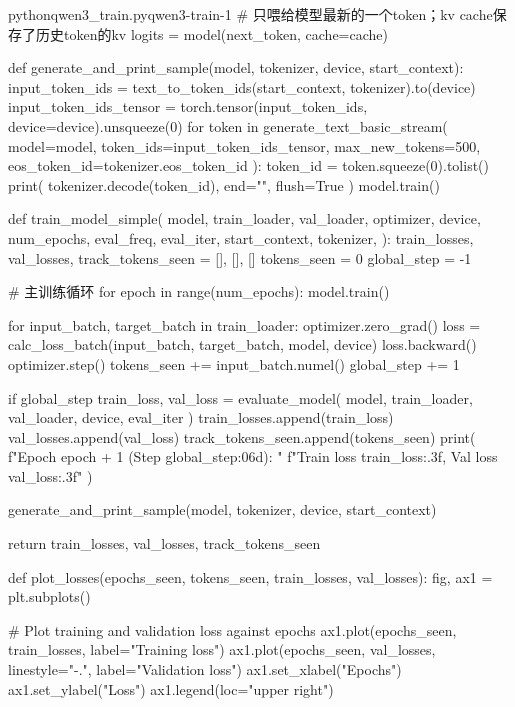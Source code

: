 \documentclass[lang=cn,newtx,10pt,scheme=chinese]{elegantbook}
\begin{document}
\begin{codebox}{python}{qwen3\_train.py}{qwen3-train-1}
            # 只喂给模型最新的一个token；kv cache保存了历史token的kv
            logits = model(next_token, cache=cache)

def generate_and_print_sample(model, tokenizer, device, start_context):
    input_token_ids = text_to_token_ids(start_context, tokenizer).to(device)
    input_token_ids_tensor = torch.tensor(input_token_ids, device=device).unsqueeze(0)
    for token in generate_text_basic_stream(
        model=model,
        token_ids=input_token_ids_tensor,
        max_new_tokens=500,
        eos_token_id=tokenizer.eos_token_id
    ):
        token_id = token.squeeze(0).tolist()
        print(
            tokenizer.decode(token_id),
            end="",
            flush=True
        )
    model.train()

def train_model_simple(
    model,
    train_loader,
    val_loader,
    optimizer,
    device,
    num_epochs,
    eval_freq,
    eval_iter,
    start_context,
    tokenizer,
):
    train_losses, val_losses, track_tokens_seen = [], [], []
    tokens_seen = 0
    global_step = -1

    # 主训练循环
    for epoch in range(num_epochs):
        model.train()

        for input_batch, target_batch in train_loader:
            optimizer.zero_grad()
            loss = calc_loss_batch(input_batch, target_batch, model, device)
            loss.backward()
            optimizer.step()
            tokens_seen += input_batch.numel()
            global_step += 1

            if global_step %
                train_loss, val_loss = evaluate_model(
                    model, train_loader, val_loader, device, eval_iter
                )
                train_losses.append(train_loss)
                val_losses.append(val_loss)
                track_tokens_seen.append(tokens_seen)
                print(
                    f"Epoch {epoch + 1} (Step {global_step:06d}): "
                    f"Train loss {train_loss:.3f}, Val loss {val_loss:.3f}"
                )

        generate_and_print_sample(model, tokenizer, device, start_context)

    return train_losses, val_losses, track_tokens_seen

def plot_losses(epochs_seen, tokens_seen, train_losses, val_losses):
    fig, ax1 = plt.subplots()

    # Plot training and validation loss against epochs
    ax1.plot(epochs_seen, train_losses, label="Training loss")
    ax1.plot(epochs_seen, val_losses, linestyle="-.", label="Validation loss")
    ax1.set_xlabel("Epochs")
    ax1.set_ylabel("Loss")
    ax1.legend(loc="upper right")


\end{codebox}
\end{document}
